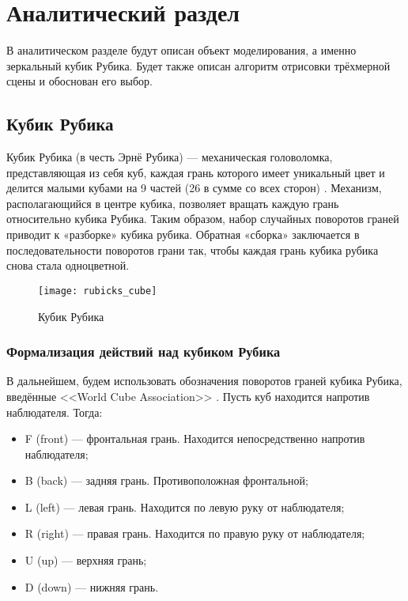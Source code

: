 \section{Аналитический раздел}
В аналитическом разделе будут описан объект моделирования, а именно зеркальный кубик Рубика. Будет также описан алгоритм отрисовки трёхмерной сцены и обоснован его выбор.

\subsection{Кубик Рубика}
Кубик Рубика (в честь Эрнё Рубика) --- механическая головоломка, представляющая из себя куб,
каждая грань которого имеет уникальный цвет и делится малыми кубами на 9 частей (26 в сумме со всех сторон) \cite{bib:how_to_assemble}.
Механизм, располагающийся в центре кубика, позволяет вращать каждую грань относительно кубика Рубика.
Таким образом, набор случайных поворотов граней приводит к «разборке» кубика рубика.
Обратная «сборка» заключается в последовательности поворотов грани так,
чтобы каждая грань кубика рубика снова стала одноцветной.

\begin{figure}[ht]
	\centering
	\texttt{[image: rubicks\_cube]}
	\caption{Кубик Рубика}
	\label{fig:rubicks_cube}
\end{figure}

\subsubsection{Формализация действий над кубиком Рубика}
В дальнейшем, будем использовать обозначения поворотов граней кубика Рубика, введённые <<World Cube Association>> \cite{bib:cube_notation}. Пусть куб находится напротив наблюдателя. Тогда:

\begin{itemize}
	\item F (front) --- фронтальная грань. Находится непосредственно напротив наблюдателя;
	\item B (back) --- задняя грань. Противоположная фронтальной;
	\item L (left) --- левая грань. Находится по левую руку от наблюдателя;
	\item R (right) --- правая грань. Находится по правую руку от наблюдателя;
	\item U (up) --- верхняя грань;
	\item D (down) --- нижняя грань.
\end{itemize}

